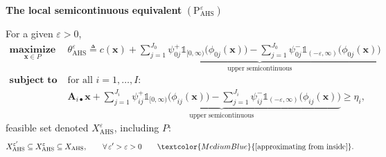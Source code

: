 \documentclass[aspectratio=169,xcolor=dvipsnames]{beamer}
\begin{document}
\begin{frame}
  \footnotesize
  \setlength{\abovedisplayskip}{4pt}
  \setlength{\belowdisplayskip}{4pt}

  \textbf{The local semicontinuous equivalent}
  $(\mathrm{P}^\varepsilon_{\mathrm{AHS}})$

  \vspace{0.04cm}
  For a given $\varepsilon>0$,
  \[
    \begin{aligned}
      \operatorname*{\textbf{maximize}}_{\mathbf{x}\in P}\ \
      &\theta^\varepsilon_{\mathrm{AHS}}\triangleq c(\mathbf{x})
        +\underbrace{\sum_{j=1}^{J_0}\psi_{0j}^+\mathds{1}_{[0,\infty)}
          \bigl(\phi_{0j}(\mathbf{x})\bigr)
          -\sum_{j=1}^{J_0}\psi_{0j}^-\mathds{1}_{(-\varepsilon,\infty)}
          \bigl(\phi_{0j}(\mathbf{x})\bigr)}_{\text{upper semicontinuous}}\\[2pt]
      \operatorname*{\textbf{subject to}}\ \ &\text{for all }i=1,\ldots,I:\\[2pt]
      &\mathbf{A}_{i\bullet}\mathbf{x}
        +\underbrace{\sum_{j=1}^{J_i}\psi_{ij}^+\mathds{1}_{[0,\infty)}
          \bigl(\phi_{ij}(\mathbf{x})\bigr)
          -\sum_{j=1}^{J_i}\psi_{ij}^-\mathds{1}_{(-\varepsilon,\infty)}
          \bigl(\phi_{ij}(\mathbf{x})\bigr)}_{\text{upper semicontinuous}}
        \geq\eta_i,
    \end{aligned}
  \]
  feasible set denoted $X^\varepsilon_{\mathrm{AHS}}$, including $P$:
  \[
    X^{\varepsilon'}_{\mathrm{AHS}}\subseteq X^\varepsilon_{\mathrm{AHS}}
    \subseteq X_{\mathrm{AHS}},\qquad\forall\,\varepsilon'>\varepsilon>0
    \qquad\textcolor{MediumBlue}{[\text{approximating from inside}]}.
  \]
\end{frame}
\end{document}

